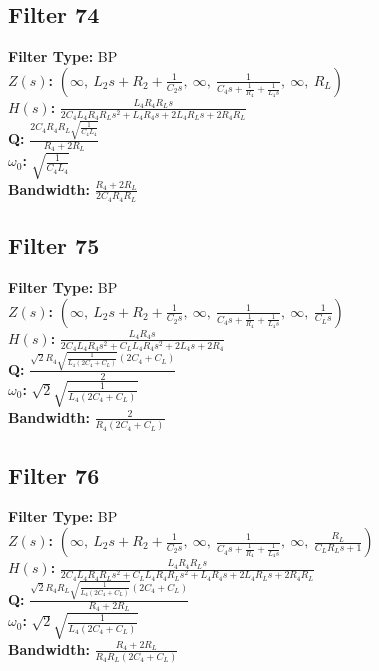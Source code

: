 \documentclass{article}
\begin{document}
\subsection*{Filter 74}
\textbf{Filter Type:} BP \\ 
\textbf{$Z(s)$:} $\left( \infty, \  L_{2} s + R_{2} + \frac{1}{C_{2} s}, \  \infty, \  \frac{1}{C_{4} s + \frac{1}{R_{4}} + \frac{1}{L_{4} s}}, \  \infty, \  R_{L}\right)$ \\ 
\textbf{$H(s)$:} $\frac{L_{4} R_{4} R_{L} s}{2 C_{4} L_{4} R_{4} R_{L} s^{2} + L_{4} R_{4} s + 2 L_{4} R_{L} s + 2 R_{4} R_{L}}$ \\ 
\textbf{Q:} $\frac{2 C_{4} R_{4} R_{L} \sqrt{\frac{1}{C_{4} L_{4}}}}{R_{4} + 2 R_{L}}$ \\ 
\textbf{$\omega_0$:} $\sqrt{\frac{1}{C_{4} L_{4}}}$ \\ 
\textbf{Bandwidth:} $\frac{R_{4} + 2 R_{L}}{2 C_{4} R_{4} R_{L}}$ \\ 
\subsection*{Filter 75}
\textbf{Filter Type:} BP \\ 
\textbf{$Z(s)$:} $\left( \infty, \  L_{2} s + R_{2} + \frac{1}{C_{2} s}, \  \infty, \  \frac{1}{C_{4} s + \frac{1}{R_{4}} + \frac{1}{L_{4} s}}, \  \infty, \  \frac{1}{C_{L} s}\right)$ \\ 
\textbf{$H(s)$:} $\frac{L_{4} R_{4} s}{2 C_{4} L_{4} R_{4} s^{2} + C_{L} L_{4} R_{4} s^{2} + 2 L_{4} s + 2 R_{4}}$ \\ 
\textbf{Q:} $\frac{\sqrt{2} R_{4} \sqrt{\frac{1}{L_{4} \left(2 C_{4} + C_{L}\right)}} \left(2 C_{4} + C_{L}\right)}{2}$ \\ 
\textbf{$\omega_0$:} $\sqrt{2} \sqrt{\frac{1}{L_{4} \left(2 C_{4} + C_{L}\right)}}$ \\ 
\textbf{Bandwidth:} $\frac{2}{R_{4} \left(2 C_{4} + C_{L}\right)}$ \\ 
\subsection*{Filter 76}
\textbf{Filter Type:} BP \\ 
\textbf{$Z(s)$:} $\left( \infty, \  L_{2} s + R_{2} + \frac{1}{C_{2} s}, \  \infty, \  \frac{1}{C_{4} s + \frac{1}{R_{4}} + \frac{1}{L_{4} s}}, \  \infty, \  \frac{R_{L}}{C_{L} R_{L} s + 1}\right)$ \\ 
\textbf{$H(s)$:} $\frac{L_{4} R_{4} R_{L} s}{2 C_{4} L_{4} R_{4} R_{L} s^{2} + C_{L} L_{4} R_{4} R_{L} s^{2} + L_{4} R_{4} s + 2 L_{4} R_{L} s + 2 R_{4} R_{L}}$ \\ 
\textbf{Q:} $\frac{\sqrt{2} R_{4} R_{L} \sqrt{\frac{1}{L_{4} \left(2 C_{4} + C_{L}\right)}} \left(2 C_{4} + C_{L}\right)}{R_{4} + 2 R_{L}}$ \\ 
\textbf{$\omega_0$:} $\sqrt{2} \sqrt{\frac{1}{L_{4} \left(2 C_{4} + C_{L}\right)}}$ \\ 
\textbf{Bandwidth:} $\frac{R_{4} + 2 R_{L}}{R_{4} R_{L} \left(2 C_{4} + C_{L}\right)}$ \\ 
\end{document}
